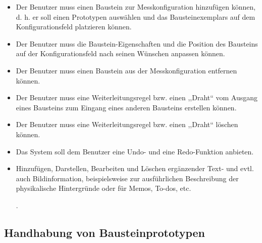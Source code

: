 \documentclass[parskip=full]{scrartcl}
\begin{document}
\begin{itemize}
	
	\item 
	\begin{MussKrit} 			
		Der Benutzer muss einen Baustein zur Messkonfiguration hinzufügen können, d. h. er soll einen Prototypen auswählen und das Bausteinexemplars auf dem Konfigurationsfeld platzieren können. 
	\end{MussKrit}
	
	\item 
	\begin{MussKrit} 		
		Der Benutzer muss die Baustein-Eigenschaften und die Position des Bausteins auf der Konfigurationsfeld nach seinen Wünschen anpassen können.
	\end{MussKrit}
	
	\item 
	\begin{MussKrit} 			
		Der Benutzer muss einen Baustein aus der Messkonfiguration entfernen können.
	\end{MussKrit}
	
	\item 
	\begin{MussKrit} 			
		Der Benutzer muss eine Weiterleitungsregel bzw. einen ,,Draht`` vom Ausgang eines Bausteins zum Eingang eines anderen Bausteins erstellen können.
	\end{MussKrit}
	
	\item 
	\begin{MussKrit} 			
		Der Benutzer muss eine Weiterleitungsregel bzw. einen ,,Draht`` löschen können.
	\end{MussKrit}
	
	\item 
	\begin{SollKrit} 			
		Das System soll dem Benutzer eine Undo- und eine Redo-Funktion anbieten.
	\end{SollKrit}
			
	\item 
	\begin{WunschKrit} 
		Hinzufügen, Darstellen, Bearbeiten und Löschen ergänzender Text- und evtl. auch Bildinformation, beispielsweise zur ausführlichen Beschreibung der physikalische Hintergründe oder für Memos, To-dos, etc.
	\end{WunschKrit}.
	
\end{itemize}

\subsection{Handhabung von Bausteinprototypen}
\end{document}
